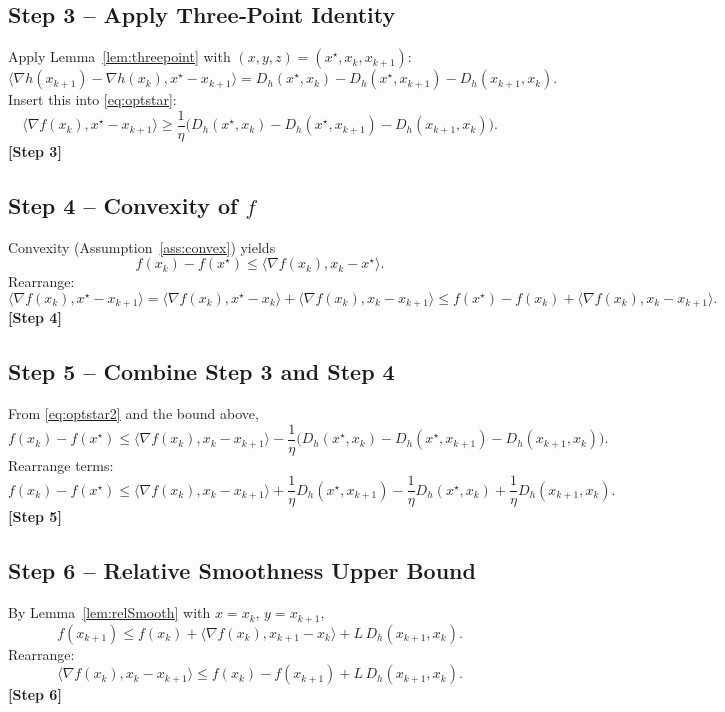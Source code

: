 \documentclass{article}
\newcommand{\grad}{\nabla}
\newcommand{\inner}[2]{\langle #1,#2\rangle}
\newcommand{\Breg}[2]{D_h(#1,#2)}
\begin{document}
\subsection*{Step 3 – Apply Three‑Point Identity}
Apply Lemma~\ref{lem:threepoint} with $(x,y,z)=(x^{\star},x_k,x_{k+1})$:
\[
\inner{\grad h(x_{k+1})-\grad h(x_k)}{x^{\star}-x_{k+1}}
= \Breg{x^{\star}}{x_k}-\Breg{x^{\star}}{x_{k+1}}-\Breg{x_{k+1}}{x_k}.
\]
Insert this into \eqref{eq:optstar}:
\begin{equation}
\label{eq:optstar2}
\inner{\grad f(x_k)}{x^{\star}-x_{k+1}}
\ge \frac{1}{\eta}\Big(\Breg{x^{\star}}{x_k}-\Breg{x^{\star}}{x_{k+1}}-\Breg{x_{k+1}}{x_k}\Big).
\end{equation}
\textbf{[Step 3]}

\subsection*{Step 4 – Convexity of $f$}
Convexity (Assumption~\ref{ass:convex}) yields
\[
f(x_k)-f(x^{\star})\le \inner{\grad f(x_k)}{x_k-x^{\star}}.
\]
Rearrange:
\[
\inner{\grad f(x_k)}{x^{\star}-x_{k+1}}
= \inner{\grad f(x_k)}{x^{\star}-x_k}+\inner{\grad f(x_k)}{x_k-x_{k+1}}
\le f(x^{\star})-f(x_k)+\inner{\grad f(x_k)}{x_k-x_{k+1}}.
\]
\textbf{[Step 4]}

\subsection*{Step 5 – Combine Step 3 and Step 4}
From \eqref{eq:optstar2} and the bound above,
\[
f(x_k)-f(x^{\star})\le \inner{\grad f(x_k)}{x_k-x_{k+1}}-\frac{1}{\eta}\Big(\Breg{x^{\star}}{x_k}-\Breg{x^{\star}}{x_{k+1}}-\Breg{x_{k+1}}{x_k}\Big).
\]
Rearrange terms:
\begin{equation}
\label{eq:basic}
f(x_k)-f(x^{\star})\le \inner{\grad f(x_k)}{x_k-x_{k+1}}+\frac{1}{\eta}\Breg{x^{\star}}{x_{k+1}}-\frac{1}{\eta}\Breg{x^{\star}}{x_k}+\frac{1}{\eta}\Breg{x_{k+1}}{x_k}.
\end{equation}
\textbf{[Step 5]}

\subsection*{Step 6 – Relative Smoothness Upper Bound}
By Lemma~\ref{lem:relSmooth} with $x=x_k$, $y=x_{k+1}$,
\[
f(x_{k+1})\le f(x_k)+\inner{\grad f(x_k)}{x_{k+1}-x_k}+L\,\Breg{x_{k+1}}{x_k}.
\]
Rearrange:
\[
\inner{\grad f(x_k)}{x_k-x_{k+1}}\le f(x_k)-f(x_{k+1})+L\,\Breg{x_{k+1}}{x_k}.
\]
\textbf{[Step 6]}
\end{document}
